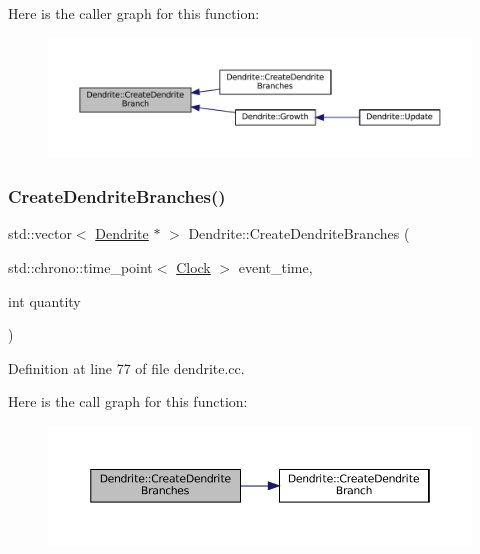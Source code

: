 Here is the caller graph for this function\+:\nopagebreak
\begin{figure}[H]
\begin{center}
\leavevmode
\includegraphics[width=350pt]{class_dendrite_ac7b30397a4753f9c37e96ed716e275eb_icgraph}
\end{center}
\end{figure}
\mbox{\label{class_dendrite_a812b9cd99ae7d81023bfa25c8f563e96}} 
\subsubsection{\texorpdfstring{Create\+Dendrite\+Branches()}{CreateDendriteBranches()}}
{\footnotesize\ttfamily std\+::vector$<$ \mbox{\hyperlink{class_dendrite}{Dendrite}} $\ast$ $>$ Dendrite\+::\+Create\+Dendrite\+Branches (\begin{DoxyParamCaption}\item[{std\+::chrono\+::time\+\_\+point$<$ \mbox{\hyperlink{universe_8h_a0ef8d951d1ca5ab3cfaf7ab4c7a6fd80}{Clock}} $>$}]{event\+\_\+time,  }\item[{int}]{quantity }\end{DoxyParamCaption})}



Definition at line 77 of file dendrite.\+cc.

Here is the call graph for this function\+:\nopagebreak
\begin{figure}[H]
\begin{center}
\leavevmode
\includegraphics[width=350pt]{class_dendrite_a812b9cd99ae7d81023bfa25c8f563e96_cgraph}
\end{center}
\end{figure}
\mbox{\label{class_dendrite_a87887a43ac38e762255da18eaaee43f5}} 
